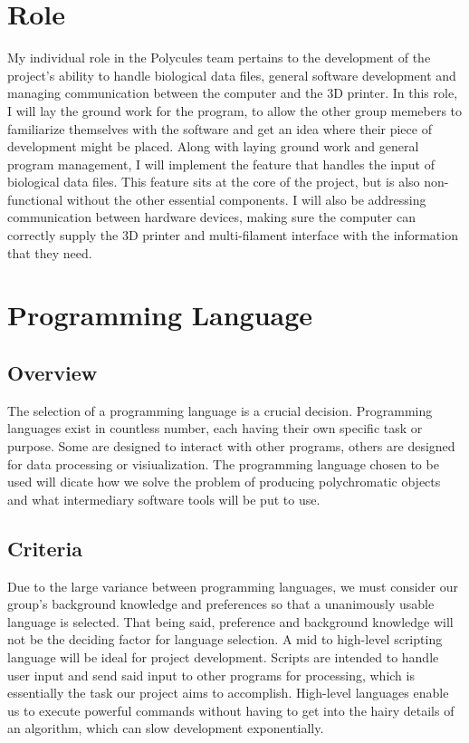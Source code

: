 \documentclass[onecolumn, draftclsnofoot,10pt, compsoc]{IEEEtran}
\begin{document}
\section{Role}
	My individual role in the Polycules team pertains to the development of the project's ability to handle biological data files, general software development and managing communication between the computer and the 3D printer.
	In this role, I will lay the ground work for the program, to allow the other group memebers to familiarize themselves with the software and get an idea where their piece of development might be placed.
	Along with laying ground work and general program management, I will implement the feature that handles the input of biological data files.
	This feature sits at the core of the project, but is also non-functional without the other essential components.
	I will also be addressing communication between hardware devices, making sure the computer can correctly supply the 3D printer and multi-filament interface with the information that they need.

\section{Programming Language}
	\subsection{Overview}
	The selection of a programming language is a crucial decision.
	Programming languages exist in countless number, each having their own specific task or purpose.
	Some are designed to interact with other programs, others are designed for data processing or visiualization.
	The programming language chosen to be used will dicate how we solve the problem of producing polychromatic objects and what intermediary software tools will be put to use.
	\subsection{Criteria}
	Due to the large variance between programming languages, we must consider our group's background knowledge and preferences so that a unanimously usable language is selected.
	That being said, preference and background knowledge will not be the deciding factor for language selection.
	A mid to high-level scripting language will be ideal for project development. 
	Scripts are intended to handle user input and send said input to other programs for processing, which is essentially the task our project aims to accomplish.
	High-level languages enable us to execute powerful commands without having to get into the hairy details of an algorithm, which can slow development exponentially.
\end{document}
